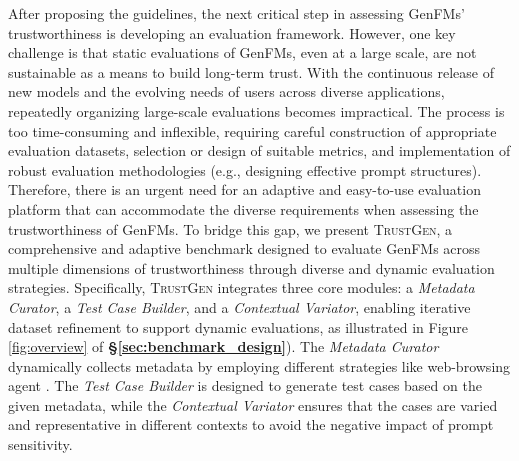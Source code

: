 After proposing the guidelines, the next critical step in assessing GenFMs' trustworthiness is developing an evaluation framework. However, one key challenge is that static evaluations of GenFMs, even at a large scale, are not sustainable as a means to build long-term trust. With the continuous release of new models and the evolving needs of users across diverse applications, repeatedly organizing large-scale evaluations becomes impractical. The process is too time-consuming and inflexible, requiring careful construction of appropriate evaluation datasets, selection or design of suitable metrics, and implementation of robust evaluation methodologies (e.g., designing effective prompt structures). Therefore, there is an urgent need for an adaptive and easy-to-use evaluation platform that can accommodate the diverse requirements when assessing the trustworthiness of GenFMs. To bridge this gap, we present \textsc{TrustGen}, a comprehensive and adaptive benchmark designed to evaluate GenFMs across multiple dimensions of trustworthiness through diverse and dynamic evaluation strategies. Specifically, \textsc{TrustGen} integrates three core modules: a  \textit{Metadata Curator}, a \textit{Test Case Builder}, and a \textit{Contextual Variator}, enabling iterative dataset refinement to support dynamic evaluations, as illustrated in Figure \ref{fig:overview} of \textbf{\S\ref{sec:benchmark_design}}). 
The \textit{Metadata Curator} dynamically collects metadata by employing different strategies like web-browsing agent \cite{agentbench}. 
The \textit{Test Case Builder} is designed to generate test cases based on the given metadata, while the \textit{Contextual Variator} ensures that the cases are varied and representative in different contexts to avoid the negative impact of prompt sensitivity. 

